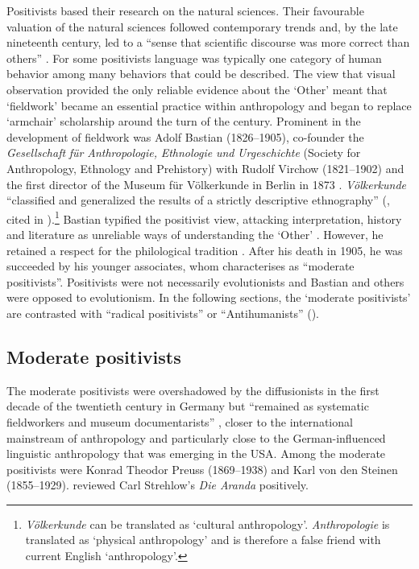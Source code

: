 \documentclass[english,output=paper,colorlinks,citecolor=brown]{../langscibook}
\begin{document}
Positivists based their research on the natural sciences. Their favourable valuation of the natural sciences followed contemporary trends and, by the late nineteenth century, led to a ``sense that scientific discourse was more correct than others'' \citep[154]{Crick1976}. For some positivists language was typically one category of human behavior among many behaviors that could be described. The view that visual observation provided the only reliable evidence about the ‘Other’ meant that ‘fieldwork’ became an essential practice within anthropology and began to replace ‘armchair’ scholarship around the turn of the century. Prominent in the development of fieldwork was Adolf Bastian (1826--1905), co-founder the \textit{Gesellschaft} \textit{für} \textit{Anthropologie,} \textit{Ethnologie} \textit{und} \textit{Urgeschichte} (Society for Anthropology, Ethnology and Prehistory) with Rudolf Virchow (1821--1902) and the first director of the Museum für Völkerkunde in Berlin in 1873 \citep{Köpping1983}. \textit{Völkerkunde} ``classified and generalized the results of a strictly descriptive ethnography'' (\citealt[19--25]{BuchheitKöpping2001}, cited in \citealt[87]{Gingrich2005}).\footnote{\textit{Völkerkunde} can be translated as `cultural anthropology'. \textit{Anthropologie} is translated as `physical anthropology' \citep[82]{Massin1996} and is therefore a false friend with current English `anthropology'.} Bastian typified the positivist view, attacking interpretation, history and literature as unreliable ways of understanding the ‘Other’ \citep[61]{Zimmerman2001}. However, he retained a respect for the philological tradition \citep[89]{Gingrich2005}. After his death in 1905, he was succeeded by his younger associates, whom \citet[91]{Gingrich2005} characterises as ``moderate positivists''. Positivists were not necessarily evolutionists and Bastian and others were opposed to evolutionism. In the following sections, the ‘moderate positivists’ \citep[99]{Gingrich2005} are contrasted with ``radical positivists'' or ``Antihumanists'' (\citealt{Zimmerman2001, Monteath2013}). 

\subsection{Moderate positivists}

The moderate positivists were overshadowed by the diffusionists in the first decade of the twentieth century in Germany but “remained as systematic fieldworkers and museum documentarists” \citep[92]{Gingrich2005}, closer to the international mainstream of anthropology and particularly close to the German-influenced linguistic anthropology that was emerging in the USA. Among the moderate positivists were Konrad Theodor Preuss (1869--1938) and Karl von den Steinen (1855--1929). \citet{Preuss1908, Preuss1909} reviewed Carl Strehlow’s \textit{Die Aranda} positively. 
\end{document}
